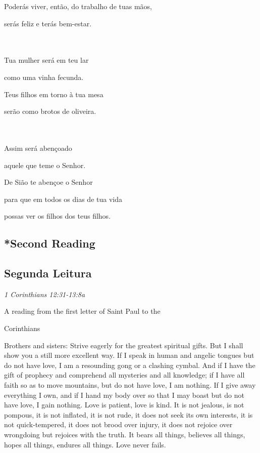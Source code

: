 \documentclass[10pt,a4]{article}
\newcommand \subsect[2] {\subsection*{#1} \switchcolumn \subsection*{#2} \switchcolumn*}
\begin{document}
\begin{paracol}{2}
Poderás viver, então, do trabalho de tuas mãos,

\hspace*{2em}serás feliz e terás bem-estar.

\\
\\

Tua mulher será em teu lar

\hspace*{2em}como uma vinha fecunda.

Teus filhos em torno à tua mesa 

\hspace*{2em}serão como brotos de oliveira.

\\
\\

Assim será abençoado 

\hspace*{2em}aquele que teme o Senhor.

De Sião te abençoe o Senhor 

\hspace*{2em}para que em todos os dias de tua vida

\hspace*{2em}possas ver os filhos dos teus filhos.


 \switchcolumn*

 \subsect{*Second Reading}{Segunda Leitura}

 \textit{1 Corinthians 12:31-13:8a}

\hspace{2em} A reading from the first letter of Saint Paul to the 

\hspace{2em} Corinthians

Brothers and sisters: Strive eagerly for the greatest spiritual gifts.
But I shall show you a still more excellent way.  
If I speak in human and angelic tongues but do not have love, I am a resounding gong or a clashing cymbal.  And if I have the gift of prophecy and comprehend all mysteries and all knowledge; if I have all faith so as to move mountains, but do not have love, I am nothing.  If I give away everything I own, and if I hand my body over so that I may boast but do not have love, I gain nothing.  
Love is patient, love is kind.  It is not jealous, is not pompous, it is not inflated, it is not rude, it does not seek its own interests, it is not quick-tempered, it does not brood over injury, it does not rejoice over wrongdoing but rejoices with the truth.  It bears all things, believes all things, hopes all things, endures all things.  Love never fails.\\


\end{paracol}
\end{document}
